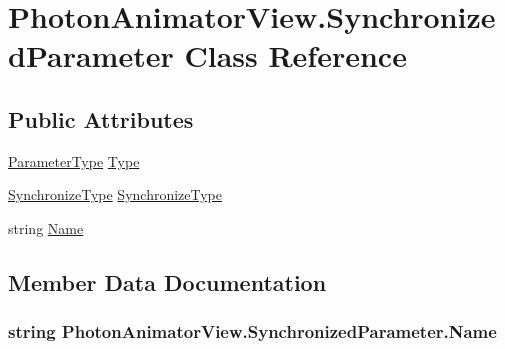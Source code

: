 \hypertarget{class_photon_animator_view_1_1_synchronized_parameter}{}\section{Photon\+Animator\+View.\+Synchronized\+Parameter Class Reference}
\label{class_photon_animator_view_1_1_synchronized_parameter}
\subsection*{Public Attributes}
\begin{DoxyCompactItemize}
\item 
\hyperlink{class_photon_animator_view_aa41dc91e8da385b9f10cf9bf5dc47894}{Parameter\+Type} \hyperlink{class_photon_animator_view_1_1_synchronized_parameter_aed91d06642473f7978a3675b9e08e5de}{Type}
\item 
\hyperlink{class_photon_animator_view_ae3ad07de936a811cbb923adffe1f167f}{Synchronize\+Type} \hyperlink{class_photon_animator_view_1_1_synchronized_parameter_a3bca909eb8a9c74c41c40c5ade8851f3}{Synchronize\+Type}
\item 
string \hyperlink{class_photon_animator_view_1_1_synchronized_parameter_afdeabdbb8e7fa234bd2743435a4362e3}{Name}
\end{DoxyCompactItemize}


\subsection{Member Data Documentation}
\subsubsection[{\texorpdfstring{Name}{Name}}]{\setlength{\rightskip}{0pt plus 5cm}string Photon\+Animator\+View.\+Synchronized\+Parameter.\+Name}\hypertarget{class_photon_animator_view_1_1_synchronized_parameter_afdeabdbb8e7fa234bd2743435a4362e3}{}\label{class_photon_animator_view_1_1_synchronized_parameter_afdeabdbb8e7fa234bd2743435a4362e3}

